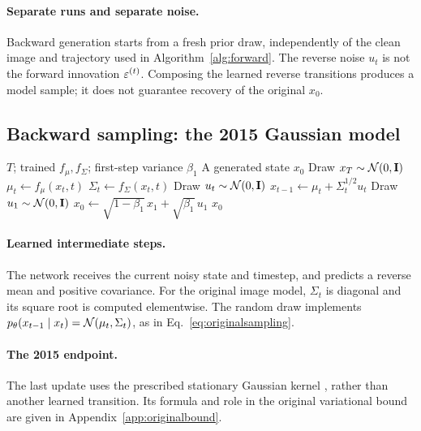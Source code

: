 \paragraph{Separate runs and separate noise.}
Backward generation starts from a fresh prior draw, independently of
the clean image and trajectory used in Algorithm~\ref{alg:forward}.
The reverse noise $u_t$ is not the forward innovation $\varepsilon^{(t)}$.
Composing the learned reverse transitions produces a model sample;
it does not guarantee recovery of the original $x_0$.

\newpage
\subsection{Backward sampling: the 2015 Gaussian model}
\begin{algorithm}[H]
\caption{Backward Gaussian sampling}
\label{alg:reverse2015}
\small
\begin{algorithmic}[1]
\Require $T$; trained $f_\mu,f_\Sigma$; first-step variance $\beta_1$
\Ensure A generated state $x_0$
\State Draw $x_T\sim\mathcal{N}(0,\mathbf{I})$
  \State $\mu_t\gets f_\mu(x_t,t)$
  \State $\Sigma_t\gets f_\Sigma(x_t,t)$
  \State Draw $u_t\sim\mathcal{N}(0,\mathbf{I})$
  \State $x_{t-1}\gets\mu_t+\Sigma_t^{1/2}u_t$
\EndFor
\State Draw $u_1\sim\mathcal{N}(0,\mathbf{I})$
\State $x_0\gets\sqrt{1-\beta_1}\,x_1+\sqrt{\beta_1}\,u_1$
\State \Return $x_0$
\end{algorithmic}
\end{algorithm}

\paragraph{Learned intermediate steps.}
The network receives the current noisy state and timestep, and
predicts a reverse mean and positive covariance. For the original
image model, $\Sigma_t$ is diagonal and its square root is computed
elementwise. The random draw implements
$p_\theta(x_{t-1}\mid x_t)=\mathcal{N}(\mu_t,\Sigma_t)$, as in
Eq.~\eqref{eq:originalsampling}.

\paragraph{The 2015 endpoint.}
The last update uses the prescribed stationary Gaussian kernel
\cite[App.~B.2]{sohl2015diffusion}, rather than another learned
transition. Its formula and role in the original variational bound
are given in Appendix~\ref{app:originalbound}.

